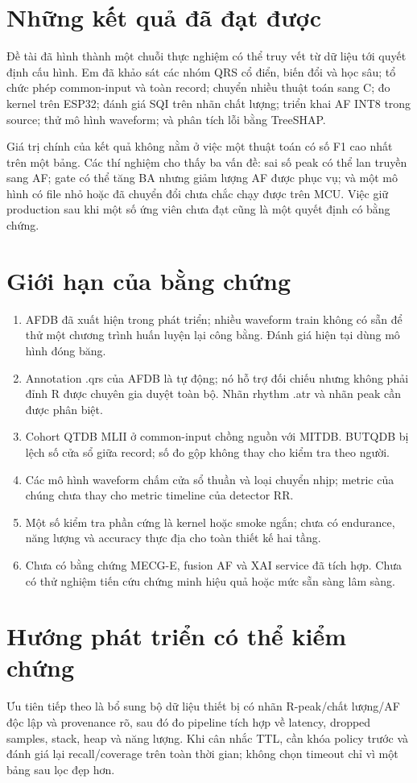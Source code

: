 \documentclass[12pt,a4paper,oneside]{report}
\begin{document}
\section{Những kết quả đã đạt được}
Đề tài đã hình thành một chuỗi thực nghiệm có thể truy vết từ dữ liệu tới quyết định cấu hình. Em đã khảo sát các nhóm QRS cổ điển, biến đổi và học sâu; tổ chức phép common-input và toàn record; chuyển nhiều thuật toán sang C; đo kernel trên ESP32; đánh giá SQI trên nhãn chất lượng; triển khai AF INT8 trong source; thử mô hình waveform; và phân tích lỗi bằng TreeSHAP.

Giá trị chính của kết quả không nằm ở việc một thuật toán có số F1 cao nhất trên một bảng. Các thí nghiệm cho thấy ba vấn đề: sai số peak có thể lan truyền sang AF; gate có thể tăng BA nhưng giảm lượng AF được phục vụ; và một mô hình có file nhỏ hoặc đã chuyển đổi chưa chắc chạy được trên MCU. Việc giữ production sau khi một số ứng viên chưa đạt cũng là một quyết định có bằng chứng.

\section{Giới hạn của bằng chứng}
\begin{enumerate}
\item AFDB đã xuất hiện trong phát triển; nhiều waveform train không có sẵn để thử một chương trình huấn luyện lại công bằng. Đánh giá hiện tại dùng mô hình đóng băng.
\item Annotation .qrs của AFDB là tự động; nó hỗ trợ đối chiếu nhưng không phải đỉnh R được chuyên gia duyệt toàn bộ. Nhãn rhythm .atr và nhãn peak cần được phân biệt.
\item Cohort QTDB MLII ở common-input chồng nguồn với MITDB. BUTQDB bị lệch số cửa sổ giữa record; số đo gộp không thay cho kiểm tra theo người.
\item Các mô hình waveform chấm cửa sổ thuần và loại chuyển nhịp; metric của chúng chưa thay cho metric timeline của detector RR.
\item Một số kiểm tra phần cứng là kernel hoặc smoke ngắn; chưa có endurance, năng lượng và accuracy thực địa cho toàn thiết kế hai tầng.
\item Chưa có bằng chứng MECG-E, fusion AF và XAI service đã tích hợp. Chưa có thử nghiệm tiến cứu chứng minh hiệu quả hoặc mức sẵn sàng lâm sàng.
\end{enumerate}

\section{Hướng phát triển có thể kiểm chứng}
Ưu tiên tiếp theo là bổ sung bộ dữ liệu thiết bị có nhãn R-peak/chất lượng/AF độc lập và provenance rõ, sau đó đo pipeline tích hợp về latency, dropped samples, stack, heap và năng lượng. Khi cân nhắc TTL, cần khóa policy trước và đánh giá lại recall/coverage trên toàn thời gian; không chọn timeout chỉ vì một bảng sau lọc đẹp hơn.
\end{document}
